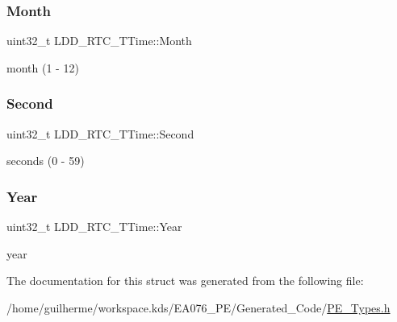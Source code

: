 \subsubsection{\texorpdfstring{Month}{Month}}
{\footnotesize\ttfamily uint32\+\_\+t L\+D\+D\+\_\+\+R\+T\+C\+\_\+\+T\+Time\+::\+Month}

month (1 -\/ 12) \mbox{\label{struct_l_d_d___r_t_c___t_time_ab6c770706c18542e856d56398850ac9e}} 
\subsubsection{\texorpdfstring{Second}{Second}}
{\footnotesize\ttfamily uint32\+\_\+t L\+D\+D\+\_\+\+R\+T\+C\+\_\+\+T\+Time\+::\+Second}

seconds (0 -\/ 59) \mbox{\label{struct_l_d_d___r_t_c___t_time_a16fbfb74b239e4b5e1889fe19d025d5e}} 
\subsubsection{\texorpdfstring{Year}{Year}}
{\footnotesize\ttfamily uint32\+\_\+t L\+D\+D\+\_\+\+R\+T\+C\+\_\+\+T\+Time\+::\+Year}

year 

The documentation for this struct was generated from the following file\+:\begin{DoxyCompactItemize}
\item 
/home/guilherme/workspace.\+kds/\+E\+A076\+\_\+\+P\+E/\+Generated\+\_\+\+Code/\hyperlink{_p_e___types_8h}{P\+E\+\_\+\+Types.\+h}\end{DoxyCompactItemize}
